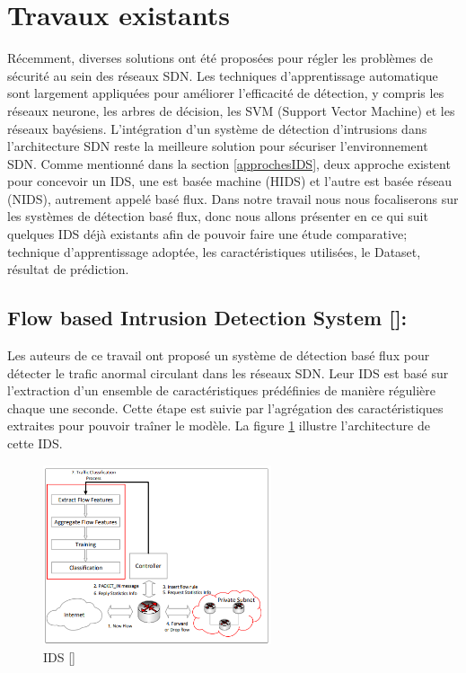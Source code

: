 \section{Travaux existants}
Récemment, diverses solutions ont été proposées pour régler les problèmes de sécurité au sein des réseaux SDN. Les techniques d’apprentissage automatique sont largement appliquées pour améliorer l’efficacité de détection, y compris les réseaux neurone, les arbres de décision, les SVM (Support Vector Machine) et les réseaux bayésiens. L'intégration d'un système de détection d'intrusions dans l'architecture SDN reste la meilleure solution pour sécuriser l'environnement SDN. Comme mentionné dans la section \ref{approchesIDS}, deux approche existent pour concevoir un IDS, une est basée machine (HIDS) et l'autre est basée réseau (NIDS), autrement appelé basé flux. Dans notre travail nous nous focaliserons sur les systèmes de détection basé flux, donc nous allons présenter en ce qui suit quelques IDS déjà existants afin de pouvoir faire une étude comparative; technique d'apprentissage adoptée, les caractéristiques utilisées, le Dataset, résultat de prédiction.\\


\subsection{Flow based Intrusion Detection System [\cite{8}]:}
Les auteurs de ce travail ont proposé un système de détection basé flux pour détecter le trafic anormal circulant dans les réseaux SDN. Leur IDS est basé sur l’extraction d’un ensemble de caractéristiques prédéfinies de manière régulière chaque une seconde. Cette étape est suivie par l’agrégation des caractéristiques extraites pour pouvoir traîner le modèle. La figure \ref{fig:NIDS1} illustre l'architecture de cette IDS.
\begin{figure}[h]
\centering
\includegraphics[width=0.6\textwidth]{Figures/NIDS1}
\decoRule
\caption{IDS [\cite{8}]}
\label{fig:NIDS1}
\end{figure}

